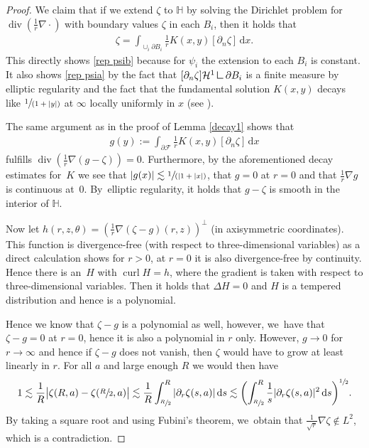 \documentclass[JEP,XML,SOM,Unicode,published]{cedram}
\newcommand{\spfrac}[2]{\sfrac{#1}{(#2)}}
\theoremstyle{definition}
\renewcommand{\div}{\operatorname{div}}
\DeclareMathOperator{\curl}{curl}
\newcommand\eq{=}
\newcommand\dd{\,\mathrm{d}}
\newcommand\dx{\dd x}
\newcommand\ds{\dd s}
\newcommand{\mres}{\mathbin{\vrule height 1.6ex depth 0pt width
0.13ex\vrule height 0.13ex depth 0pt width 1.3ex}}
\let\de\partial
\begin{document}
\begin{proof}
We claim that if we extend $\zeta$ to $\mathbb{H}$ by solving the Dirichlet problem for $\div(\frac{1}{r}\nabla\cdot)$ with boundary values $\zeta$ in each $B_i$, then it holds that
\begin{align*}
\zeta\eq \int_{\cup_i\de B_i}\frac{1}{r}K(x,y)[\de_n\zeta]\dx.
\end{align*}
This directly shows \eqref{rep psib} because for $\psi_i$ the extension to each $B_i$ is constant. It also shows \eqref{rep psia} by the fact that $[\de_n\zeta]\mathcal{H}^1\mres \de B_i$ is a finite measure by elliptic regularity and the fact that the fundamental solution $K(x,y)$ decays like $\spfrac{1}{1+|y|}$ at $\infty$ locally uniformly in $x$ (see \cite[Lem.\,2.1\,ii)]{GallaySverak}).

The same argument as in the proof of Lemma \ref{decay1} shows that
\begin{align*}
g(y):=\int_{\de\mathcal{F}}\frac{1}{r}K(x,y)[\de_n\zeta]\dx
\end{align*}
fulfills $\div(\frac{1}{r}\nabla (g-\zeta))=0$. Furthermore, by the aforementioned decay estimates for~$K$ we see that $|g(x)|\lesssim \spfrac{1}{|1+|x|}$, that $g=0$ at $r=0$ and that $\frac{1}{r}\nabla g$ is continuous at~$0$. By~elliptic regularity, it holds that $g-\zeta$ is smooth in the interior of $\mathbb{H}$.

Now let $h(r,z,\theta)=(\frac{1}{r}\nabla(\zeta-g)(r,z))^\perp$ (in axisymmetric coordinates). This function is divergence-free (with respect to three-dimensional variables) as a direct calculation shows for $r>0$, at $r=0$ it is also divergence-free by continuity.
Hence there is an~$H$ with $\curl H=h$, where the gradient is taken with respect to three-dimensional variables. Then it holds that $\Delta H=0$ and $H$ is a tempered distribution and hence is a polynomial.

Hence we know that $\zeta-g$ is a polynomial as well, however, we~have that $\zeta-g=0$ at $r=0$, hence it is also a polynomial in $r$ only. However, $g\to 0$ for $r\to \infty$ and hence if $\zeta-g$ does not vanish, then $\zeta$ would have to grow at least linearly in $r$. For all $a$ and large enough $R$ we would then have
\begin{align*}
1\lesssim \frac{1}{R}\bigl|\zeta(R,a)-\zeta(\sfrac{R}{2},a)\bigr|\lesssim \frac{1}{R}\int_{\sfrac{R}{2}}^R|\de_r\zeta(s,a)|\ds\lesssim \biggl(\int_{\sfrac{R}{2}}^R\frac{1}{s}|\de_r\zeta(s,a)|^2\ds\biggr)^{\sfrac{1}{2}}.
\end{align*}
By taking a square root and using Fubini's theorem, we~obtain that $\frac{1}{\sqrt{r}}\nabla\zeta\notin L^2$, which is a contradiction.
\end{proof}
\end{document}

